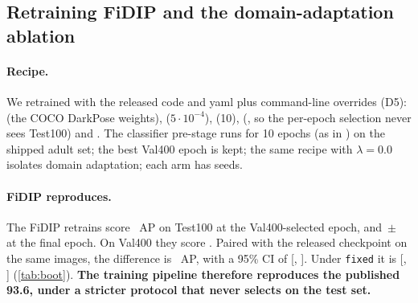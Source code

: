 \begin{table}[t]
  \centering\small
  \caption[Reproduction on Test100 and Val400]{Reproduction on SyRIP Test100 (\texttt{paper} protocol unless marked; GT boxes; flip test) and on Val400.
  \emph{Upper block:} released checkpoints, scored by .
  \emph{Lower block:} our retrains of the released recipe from COCO DarkPose weights, mean $\pm$ s.d.\ over seeds, at the Val400-selected epoch and at the final epoch.
  ``Publ.'' is the published AP~\citep{huang2021fidip,fidipcode}; ``clean'' is Test100-clean.}
  \label{tab:repro}
\end{table}

\subsection{Retraining FiDIP and the domain-adaptation ablation}\label{sec:retrain}

\paragraph{Recipe.} We retrained with the released code and yaml plus command-line overrides (D5):  (the COCO DarkPose weights),  ($5{\cdot}10^{-4}$),  (10),  (, so the per-epoch selection never sees Test100) and .
The classifier pre-stage runs for 10 epochs (as in ) on the shipped adult set; the best Val400 epoch is kept; the same recipe with $\lambda=0.0$ isolates domain adaptation; each arm has  seeds.

\paragraph{FiDIP reproduces.} The FiDIP retrains score ~AP on Test100 at the Val400-selected epoch, and \,{\footnotesize$\pm$\,} at the final epoch. On Val400 they score .
Paired with the released checkpoint on the same images, the difference is ~AP, with a 95\% CI of [, ]. Under \texttt{fixed} it is  [, ] (\cref{tab:boot}).
\textbf{The training pipeline therefore reproduces the published 93.6, under a stricter protocol that never selects on the test set.}

